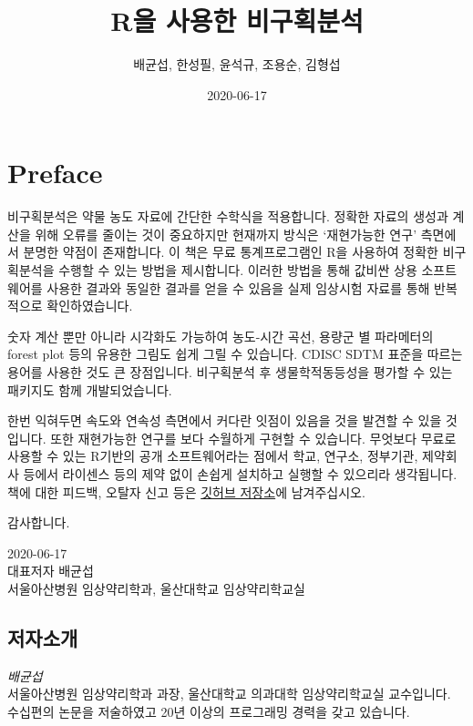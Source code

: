 \documentclass[
  12pt,
]{krantz}
\title{R을 사용한 비구획분석}
\author{배균섭, 한성필, 윤석규, 조용순, 김형섭}
\date{2020-06-17}
\begin{document}
\maketitle

{
\hypersetup{linkcolor=}
\setcounter{tocdepth}{2}
\tableofcontents
}
\hypertarget{preface}{%
\chapter*{Preface}\label{preface}}


\href{https://github.com/asancpt/book-ncar}{}

비구획분석은 약물 농도 자료에 간단한 수학식을 적용합니다. 정확한 자료의 생성과 계산을 위해 오류를 줄이는 것이 중요하지만 현재까지 방식은 `재현가능한 연구' 측면에서 분명한 약점이 존재합니다. 이 책은 무료 통계프로그램인 R을 사용하여 정확한 비구획분석을 수행할 수 있는 방법을 제시합니다.
이러한 방법을 통해 값비싼 상용 소프트웨어를 사용한 결과와 동일한 결과를 얻을 수 있음을 실제 임상시험 자료를 통해 반복적으로 확인하였습니다.

숫자 계산 뿐만 아니라 시각화도 가능하여 농도-시간 곡선, 용량군 별 파라메터의 forest plot 등의 유용한 그림도 쉽게 그릴 수 있습니다.
CDISC SDTM 표준을 따르는 용어를 사용한 것도 큰 장점입니다.
비구획분석 후 생물학적동등성을 평가할 수 있는 패키지도 함께 개발되었습니다.

한번 익혀두면 속도와 연속성 측면에서 커다란 잇점이 있음을 것을 발견할 수 있을 것입니다.
또한 재현가능한 연구를 보다 수월하게 구현할 수 있습니다.
무엇보다 무료로 사용할 수 있는 R기반의 공개 소프트웨어라는 점에서 학교, 연구소, 정부기관, 제약회사 등에서 라이센스 등의 제약 없이 손쉽게 설치하고 실행할 수 있으리라 생각됩니다.
책에 대한 피드백, 오탈자 신고 등은 \href{https://github.com/asancpt/book-ncar/issues}{깃허브 저장소}에 남겨주십시오.

감사합니다.

2020-06-17\\
대표저자 배균섭\\
서울아산병원 임상약리학과, 울산대학교 임상약리학교실

\hypertarget{uxc800uxc790uxc18cuxac1c}{%
\section*{저자소개}\label{uxc800uxc790uxc18cuxac1c}}


\emph{배균섭}\\
서울아산병원 임상약리학과 과장, 울산대학교 의과대학 임상약리학교실 교수입니다. 수십편의 논문을 저술하였고 20년 이상의 프로그래밍 경력을 갖고 있습니다.
\end{document}
